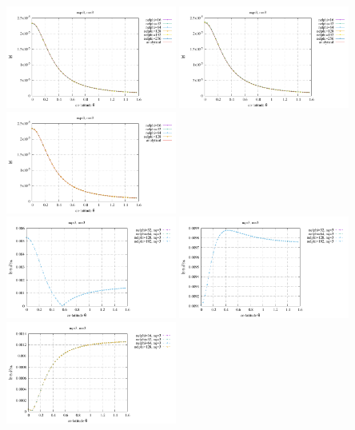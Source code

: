 \begin{center}
\includegraphics[width=5.6cm]{python_codes/fieldstone_152/RESULTS/exp2/gravity/nelr64/gravity.pdf}
\includegraphics[width=5.6cm]{python_codes/fieldstone_152/RESULTS/exp2/gravity/nelr96/gravity.pdf}
\includegraphics[width=5.6cm]{python_codes/fieldstone_152/RESULTS/exp2/gravity/nelr128/gravity.pdf}\\
\includegraphics[width=5.6cm]{python_codes/fieldstone_152/RESULTS/exp2/gravity/nelr64/gravity_error.pdf}
\includegraphics[width=5.6cm]{python_codes/fieldstone_152/RESULTS/exp2/gravity/nelr96/gravity_error.pdf}
\includegraphics[width=5.6cm]{python_codes/fieldstone_152/RESULTS/exp2/gravity/nelr128/gravity_error.pdf}\\
\end{center}

